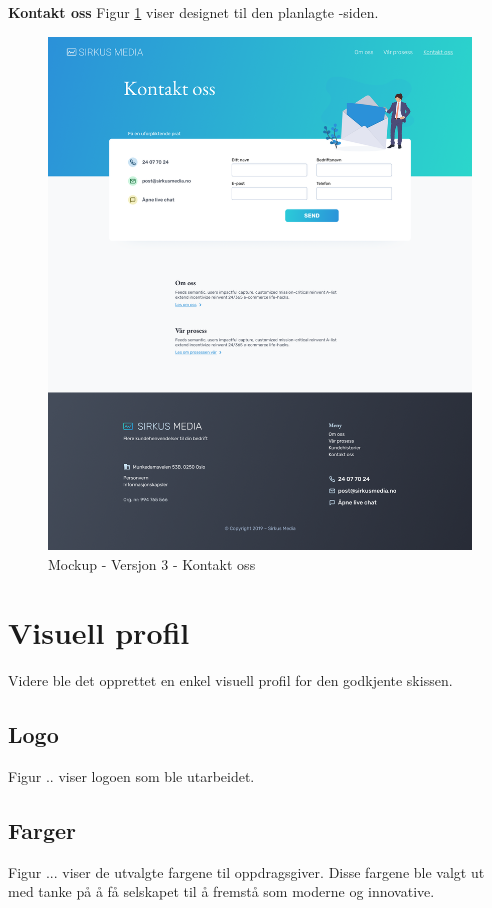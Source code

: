 \textbf{Kontakt oss}
Figur \ref{fig:mockup-v3-contact} viser designet til den planlagte -siden.
\begin{figure}[H]
    \centering
    \includegraphics[width=\textwidth]{mockup3-contact.png}
    \caption{Mockup - Versjon 3 - Kontakt oss}
    \label{fig:mockup-v3-contact}
\end{figure}


\section{Visuell profil}
Videre ble det opprettet en enkel visuell profil for den godkjente skissen.

\subsection{Logo}
Figur .. viser logoen som ble utarbeidet.

\subsection{Farger}
Figur ... viser de utvalgte fargene til oppdragsgiver. Disse fargene ble valgt ut med tanke på å få selskapet til å fremstå som moderne og innovative.

